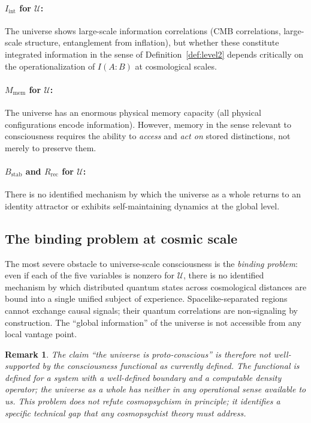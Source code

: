 \documentclass[12pt,letterpaper]{article}
\newtheorem{remark}{Remark}[section]
\newcommand{\Iint}{I_{\mathrm{int}}}
\newcommand{\Mmem}{M_{\mathrm{mem}}}
\newcommand{\Bstab}{B_{\mathrm{stab}}}
\newcommand{\Rrec}{R_{\mathrm{rec}}}
\begin{document}
\paragraph{$\Iint$ for $\mathcal{U}$:} The universe shows large-scale
information correlations (CMB correlations, large-scale structure, entanglement
from inflation), but whether these constitute integrated information in the
sense of Definition~\ref{def:level2} depends critically on the
operationalization of $I(A:B)$ at cosmological scales.

\paragraph{$\Mmem$ for $\mathcal{U}$:} The universe has an enormous physical
memory capacity (all physical configurations encode information). However,
memory in the sense relevant to consciousness requires the ability to
\emph{access} and \emph{act on} stored distinctions, not merely to preserve them.

\paragraph{$\Bstab$ and $\Rrec$ for $\mathcal{U}$:} There is no identified
mechanism by which the universe as a whole returns to an identity attractor
or exhibits self-maintaining dynamics at the global level.

\subsection{The binding problem at cosmic scale}

The most severe obstacle to universe-scale consciousness is the
\emph{binding problem}: even if each of the five variables is nonzero for
$\mathcal{U}$, there is no identified mechanism by which distributed
quantum states across cosmological distances are bound into a single unified
subject of experience. Spacelike-separated regions cannot exchange causal
signals; their quantum correlations are non-signaling by construction. The
``global information'' of the universe is not accessible from any local
vantage point.

\begin{remark}
The claim ``the universe is proto-conscious'' is therefore not well-supported
by the consciousness functional as currently defined. The functional is defined
for a system with a well-defined boundary and a computable density operator;
the universe as a whole has neither in any operational sense available to us.
This problem does not refute cosmopsychism in principle; it identifies a
specific technical gap that any cosmopsychist theory must address.
\end{remark}
\end{document}
